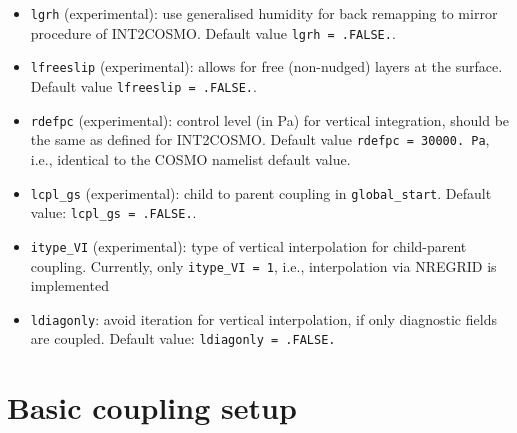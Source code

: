 \documentclass[11pt,twoside]{article}
\begin{document}
\begin{itemize}
\begin{itemize}
\end{itemize}
\item \verb|lgrh| (experimental): use generalised humidity for back
remapping to mirror procedure of INT2COSMO. Default value \verb|lgrh = .FALSE.|.
\item \verb|lfreeslip| (experimental): allows for free (non-nudged) layers at
the surface. Default value \verb|lfreeslip = .FALSE.|.
\item \verb|rdefpc| (experimental): control level (in Pa) for vertical
integration, should be the same as defined for INT2COSMO. Default value 
\verb|rdefpc = 30000. Pa|, i.e., identical to the COSMO namelist default value. 
\item \verb|lcpl_gs| (experimental): child to parent coupling
in \verb|global_start|. Default value: \verb|lcpl_gs = .FALSE.|.
\item \verb|itype_VI| (experimental): type of vertical interpolation for
child-parent coupling. Currently, only \verb|itype_VI = 1|, i.e., interpolation
via NREGRID is implemented
\item \verb|ldiagonly|: avoid iteration for vertical
interpolation, if only diagnostic fields are coupled. Default
value:  \verb|ldiagonly = .FALSE.|

\end{itemize}



\section{Basic coupling setup}\label{sec:basesetup}
\end{document}
